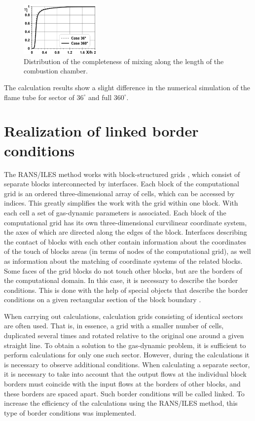 \documentclass[
11pt,%
tightenlines,%
twoside,%
onecolumn,%
nofloats,%
nobibnotes,%
nofootinbib,%
superscriptaddress,%
noshowpacs,%
centertags]%
{revtex4}
\begin{document}
\begin{figure}[ht]
\setcaptionmargin{5mm}
\onelinecaptionstrue
\includegraphics[width=0.35\textwidth]{pics/p6.png}
\caption{Distribution of the  completeness of
mixing along the length of the combustion chamber.} \label{fig:p6}
\end{figure}

The calculation results show a slight difference in the  numerical
simulation of the flame tube for sector of $36^{\circ}$ and full
$360^{\circ}$.

\section{Realization of linked border conditions}

The RANS/ILES method works with block-structured grids
\cite{Farrashkhalvat,Liseikin},  which consist of separate blocks
interconnected by interfaces. Each block of the computational grid
is an ordered three-dimensional array of cells, which can be
accessed by indices. This greatly simplifies the work with the grid
within one block. With each cell a set of gas-dynamic parameters is
associated. Each block of the computational grid has its own
three-dimensional curvilinear coordinate system, the axes of which
are directed along the edges of the block. Interfaces describing the
contact of blocks with each other contain information about the
coordinates of the touch of blocks areas (in terms of nodes of the
computational grid), as well as information about the matching of
coordinate systems of the related blocks. Some faces of the grid
blocks do not touch other blocks, but are the borders of the
computational domain. In this case, it is necessary to describe the
border conditions. This is done with the help of special objects
that describe the border conditions on a given rectangular section
of the block boundary \cite{Rybakov}.

When carrying out calculations, calculation grids consisting of
identical sectors are often used. That is, in essence, a grid with a
smaller number of cells, duplicated several times and rotated
relative to the original one around a given straight line. To obtain
a solution to the gas-dynamic problem, it is sufficient to perform
calculations for only one such sector. However, during the
calculations it is necessary to observe additional conditions. When
calculating a separate sector, it is necessary to take into account
that the output flows at the individual block borders must coincide
with the input flows at the borders of other blocks, and these
borders are spaced apart. Such border conditions will be called
linked. To increase the efficiency of the calculations using the
RANS/ILES method, this type of border conditions was implemented.
\end{document}
